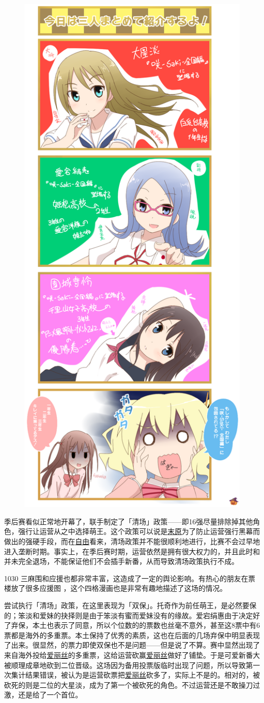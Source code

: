 \begin{figure}
  \includegraphics[width=.45\textwidth]{images/u6566.png}
\end{figure}

季后赛看似正常地开幕了，联手制定了「清场」政策——即16强尽量排除掉其他角色，强行让运营从之中选择萌王。这个政策可以说是\uline{末原}为了防止运营强行黑幕而做出的强硬手段，而在\uline{自由}看来，清场政策并不能很顺利地进行，比赛不会过早地进入垄断时期。事实上，在季后赛时期，运营依然是拥有很大权力的，并且此时和并未完全退场，不能保证他们不会插手新番，从而导致清场政策执行不成。

1030 三麻围和应援也都非常丰富，这造成了一定的舆论影响。有热心的朋友在票楼放了很多应援图
，这个四格漫画也是非常有趣地描述了这场的情况。

尝试执行「清场」政策，在这里表现为「双保」。托奇作为前任萌王，是必然要保的；笨淡和爱妹的抉择则是由于笨淡有蜜而爱妹没有的缘故。爱宕绢惠由于决定好了弃保，本土也表示了同意，所以个位数的的票数也丝毫不意外，甚至这8票中有6票都是海外的多重票。本土保持了优秀的素质，这也在后面的几场弃保中明显表现了出来。很显然，的票力即使双保也不是问题——但是说了不算。赛中显然出现了来自海外投给\uline{爱丽丝}的多重票，这给运营砍赢\uline{爱丽丝}做好了铺垫。于是可爱新番大被顺理成章地砍到二位晋级。这场因为备用投票版临时出现了问题，所以导致第一次集计结果错误，被认为是运营砍票把\uline{爱丽丝}砍多了，实际上不是的。相对的，被砍死的则是二位的大星淡，成为了第一个被砍死的角色。不过运营还是不敢操刀过激，还是给了一个首位。

